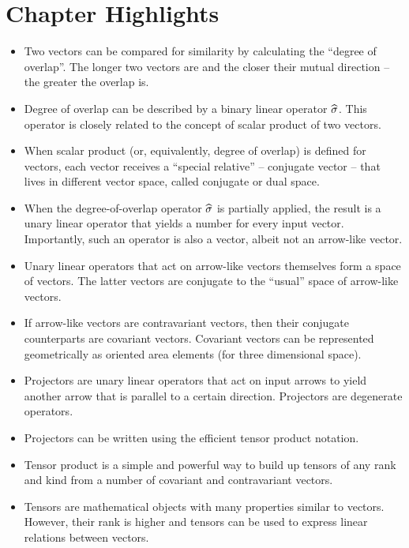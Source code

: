 \section*{Chapter Highlights}
{\chhc
  \it
  \small
\begin{itemize}
\item Two vectors can be compared for similarity by calculating the
  ``degree of overlap''. The longer two vectors are and the closer
  their mutual direction -- the greater the overlap is.
\item Degree of overlap can be described by a binary linear operator
  $\widehat{\sigma}$. This operator is closely related to the concept of
  scalar product of two vectors.
\item When scalar product (or, equivalently, degree of overlap) is
  defined for vectors, each vector receives a ``special relative'' --
  conjugate vector -- that lives in different vector space, called
  conjugate or dual space.
\item When the degree-of-overlap operator $\widehat{\sigma}$ is partially
  applied, the result is a unary linear operator that yields a number
  for every input vector. Importantly, such an operator is also a
  vector, albeit not an arrow-like vector.
\item Unary linear operators that act on arrow-like vectors themselves
  form a space of vectors. The latter vectors are conjugate to the
  ``usual'' space of  arrow-like vectors.
\item If arrow-like vectors are contravariant vectors, then their
  conjugate counterparts are covariant vectors. Covariant vectors can
  be represented geometrically as oriented area elements (for three
  dimensional space).
\item Projectors are unary linear operators that act on input arrows
  to yield another arrow that is parallel to a certain
  direction. Projectors are degenerate operators.
\item Projectors can be written using the efficient tensor product
  notation.
\item Tensor product is a simple and powerful way to build up tensors
  of any rank and kind from a number of covariant and contravariant
  vectors.
\item Tensors are mathematical objects with many properties similar to
  vectors. However, their rank is higher and tensors can be used to
  express linear relations between vectors.
\end{itemize}

}
